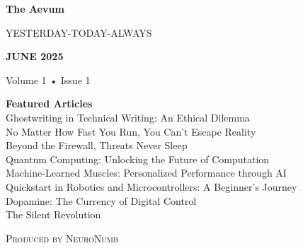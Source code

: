 \documentclass[a4paper,10pt,twocolumn]{memoir}
\begin{document}
\begin{titlingpage}
\thispagestyle{empty}
\begin{center}
\vspace*{1.5cm}
{\fontsize{42}{50}\selectfont\bfseries\color{primary}The Aevum}
\vspace{0.5cm}

{\Large\scshape\color{accent}YESTERDAY-TODAY-ALWAYS}
\vspace{1.5cm}

\vspace{1cm}

{\Huge\bfseries\color{dark}JUNE 2025}
\vspace{0.2cm}

{\large Volume 1 • Issue 1}
\vfill

{\large\bfseries Featured Articles}\\[0.5em]
{\color{dark}
Ghostwriting in Technical Writing: An Ethical Dilemma \\
No Matter How Fast You Run, You Can’t Escape Reality\\
Beyond the Firewall, Threats Never Sleep\\
Quantum Computing: Unlocking the Future of Computation\\
Machine-Learned Muscles: Personalized Performance through AI\\
Quickstart in Robotics and Microcontrollers: A Beginner's Journey\\
Dopamine: The Currency of Digital Control}\\
The Silent Revolution
\vfill

{\small\scshape\color{gray}Produced by NeuroNumb}
\end{center}
\end{titlingpage}
\end{document}
